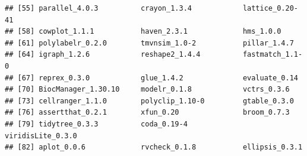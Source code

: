 \documentclass[
  11pt,
]{article}
\begin{document}
\begin{verbatim}
## [55] parallel_4.0.3          crayon_1.3.4            lattice_0.20-41        
## [58] cowplot_1.1.1           haven_2.3.1             hms_1.0.0              
## [61] polylabelr_0.2.0        tmvnsim_1.0-2           pillar_1.4.7           
## [64] igraph_1.2.6            reshape2_1.4.4          fastmatch_1.1-0        
## [67] reprex_0.3.0            glue_1.4.2              evaluate_0.14          
## [70] BiocManager_1.30.10     modelr_0.1.8            vctrs_0.3.6            
## [73] cellranger_1.1.0        polyclip_1.10-0         gtable_0.3.0           
## [76] assertthat_0.2.1        xfun_0.20               broom_0.7.3            
## [79] tidytree_0.3.3          coda_0.19-4             viridisLite_0.3.0      
## [82] aplot_0.0.6             rvcheck_0.1.8           ellipsis_0.3.1
\end{verbatim}
\end{document}
